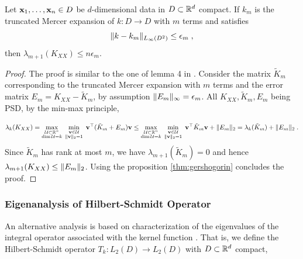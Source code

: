 \documentclass{article}
\begin{document}
\begin{proposition} \label{thm:mercer_error}
Let $\boldsymbol{\mathbf{x}}_1, \ldots, \boldsymbol{\mathbf{x}}_n \in D$ be $d$-dimensional data in $D \subset \mathbb R^d$ compact.
If $k_m$ is the truncated Mercer expansion of $k: D\to D$ with $m$ terms and satisfies 
\begin{equation*}
    \Vert k - k_m \Vert_{L_\infty (D^2)} \le \epsilon_m \;,
\end{equation*}
then $\lambda_{m+1}(K_{XX}) \le n \epsilon_m$.
\end{proposition}
\begin{proof}
The proof is similar to the one of lemma 4 in \cite{gardner_gpytorch_2021}. Consider the matrix $\tilde K_m$ corresponding to the truncated Mercer expansion with $m$ terms and the error matrix $E_m = K_{XX} - \tilde K_m$, by assumption $\Vert E_m \Vert_\infty = \epsilon_m$. All $K_{XX}, \tilde K_m, E_m$ being PSD, by the min-max principle,

\begin{equation*}
    \lambda_{k}(K_{XX}) = 
    \max_{\substack{\mathcal U \subset \mathbb R^n \\ \dim \mathcal U = k}} \;
    \min_{\substack{\boldsymbol{\mathbf{v}} \in \mathcal U \\ \Vert \boldsymbol{\mathbf{v}} \Vert_2 = 1}} \;
    \boldsymbol{\mathbf{v}}^\top (\tilde K_m + E_m) \boldsymbol{\mathbf{v}} \le  
    \max_{\substack{\mathcal U \subset \mathbb R^n \\ \dim \mathcal U = k}} \;
    \min_{\substack{\boldsymbol{\mathbf{v}} \in \mathcal U \\ \Vert \boldsymbol{\mathbf{v}} \Vert_2 = 1}} \;
    \boldsymbol{\mathbf{v}}^\top \tilde K_m \boldsymbol{\mathbf{v}} + \Vert E_m \Vert_2 = \lambda_k(\tilde K_m) + \Vert E_m \Vert_2 \; .
\end{equation*}
%
Since $\tilde K_m$ has rank at most $m$, we have $\lambda_{m+1}(\tilde K_m) = 0$ and hence $\lambda_{m+1}(K_{XX}) \le \Vert E_m \Vert_2$. Using the proposition \ref{thm:gershogorin} concludes the proof. 
\end{proof}


\subsubsection{Eigenanalysis of Hilbert-Schmidt Operator} 

An alternative analysis is based on characterization of the eigenvalues of the integral operator associated with the kernel function \cite{banerjee_parallel_2013, pan_learning_2011, bach_kernel_2002}. That is, we define the Hilbert-Schmidt operator $T_k : L_2(D) \to L_2(D)$ with $D \subset \mathbb R^d$ compact,
\end{document}
